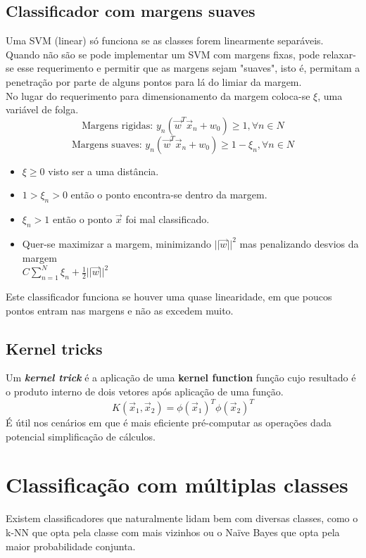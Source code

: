 \documentclass[]{report}
\begin{document}
\subsection{Classificador com margens suaves}
Uma SVM (linear) só funciona se as classes forem linearmente separáveis. Quando não são se pode implementar um SVM com margens fixas, pode relaxar-se esse requerimento e permitir que as margens sejam "suaves", isto é, permitam a penetração por parte de alguns pontos para lá do limiar da margem.\\
No lugar do requerimento para dimensionamento da margem coloca-se $\xi$, uma variável de folga.
$$\text{Margens rigidas: } y_n(\vec{w}^T \vec{x}_n + w_0) \geq 1, \forall n \in N$$
$$\text{Margens suaves: } y_n(\vec{w}^T \vec{x}_n + w_0) \geq 1 - \xi_n, \forall n \in N$$
\begin{itemize}
\item $\xi \geq 0$ visto ser a uma distância.
\item $1 > \xi_n > 0$ então o ponto encontra-se dentro da margem.
\item $\xi_n > 1$ então o ponto $\vec{x}$ foi mal classificado.
\item Quer-se maximizar a margem, minimizando $||\vec{w}||^2$ mas penalizando desvios da margem\\
$\displaystyle C \sum_{n=1}^N \xi_n + \frac{1}{2}||\vec{w}||^2$
\end{itemize}
Este classificador funciona se houver uma quase linearidade, em que poucos pontos entram nas margens e não as excedem muito.
\subsection{Kernel tricks}
Um \textit{\textbf{kernel trick}} é a aplicação de uma \textbf{kernel function} função cujo resultado é o produto interno de dois vetores após aplicação de uma função.
$$K(\vec{x}_1,\vec{x}_2) = \phi(\vec{x}_1)^T \phi(\vec{x}_2)^T$$
É útil nos cenários em que é mais eficiente pré-computar as operações dada potencial simplificação de cálculos.
\section{Classificação com múltiplas classes}
Existem classificadores que naturalmente lidam bem com diversas classes, como o k-NN que opta pela classe com mais vizinhos ou o Naïve Bayes que opta pela maior probabilidade conjunta.
\end{document}
